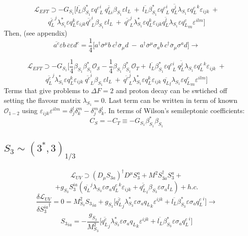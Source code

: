 \documentclass{article}
\begin{document}
\[
\mathcal{L}_{EFT} \supset -G_{S_1} \big[  \overline{l_L} \beta^*_{S_1} \varepsilon {q^c}^i_{L} \ \overline{q^c_{L i}} \beta_{S_1} \varepsilon l_L \ + \  \overline{l_L} \beta^*_{S_1} \varepsilon {q^c}^i_{L} \ \overline{q^j_L} \lambda_{S_1} \varepsilon {q^{c}_L}^k \varepsilon_{ijk} \ + 
\]
\[
\overline{q^c_L}^j \lambda_{S_1}^* \varepsilon q^k_L \varepsilon_{ijk}  \overline{q^c}^i_{L} \beta_{S_1} \varepsilon l_L \ + \ \overline{q^c}_L^j \lambda_{S_1}^* \varepsilon q^k_L \varepsilon_{ijk}  \overline{q^l_L} \lambda_{S_1} \varepsilon {q^c_L}_m \varepsilon^{ilm} \big]
\]
Then, (see appendix)
\[
\overline{a^c} \varepsilon b \  \overline{c} \varepsilon d^c =\frac{1}{4}\big[ a^\dagger \overline{\sigma}^ \mu b \ c^\dagger \overline{\sigma}_\mu d \ - \ a^\dagger \overline{\sigma}^\mu  \sigma_a b \ c^\dagger \overline{\sigma}_\mu  \sigma^a d \big] \rightarrow
\]

\[
\mathcal{L}_{EFT} \supset -G_{S_1} \big[ \frac{1}{4} \beta_{S_1} \beta_{S_1}^* \mathcal{O_S} - \frac{1}{4} \beta_{S_1} \beta_{S_1}^* \mathcal{O}_T + \  \overline{l_L} \beta^*_{S_1} \varepsilon {q^c}^i_{L} \ \overline{q^j_L} \lambda_{S_1} \varepsilon {q^{c}_L}^k \varepsilon_{ijk} \ + 
\]
\[
\overline{q^c_L}^j \lambda_{S_1}^* \varepsilon q^k_L \varepsilon_{ijk} \  \overline{q^c}^i_{L} \beta_{S_1} \varepsilon l_L \ + \ \overline{q^c}_L^j \lambda_{S_1}^* \varepsilon q^k_L \varepsilon_{ijk} \ \overline{q_L}_l \lambda_{S_1} \varepsilon {q^c_L}_m \varepsilon^{ilm} \big]
\]
Terms that give problems to $\Delta F=2$ and proton decay can be swtiched off setting the flavour matrix $\lambda_{S_1}=0$. Last term can be written in term of known $\mathcal{O}_{1-2}$ using $\varepsilon_{ijk} \varepsilon^{ilm} = \delta_j^l \delta_k^m -\delta_j^m \delta_k^l $.
In terms of Wilson's semileptonic coefficients:
\[
C_S = - C_T \equiv - G_{S_1} \beta^*_{S_1} \beta_{S_1} 
\]
\subsection{$S_3 \sim (3^*, 3)_{1/3}$}
\[
\mathcal{L}_{UV} \supset (D_\mu S_{3a})^\dagger D^\mu S_3^a + M^2 S_{3a}^\dagger S_3^a +
\]
\[
+g_{S_3} S_3^{ia}(\overline{q_L}^j \lambda_{S_3} \varepsilon \sigma_a {q^c_L}^k \varepsilon_{ijk} + \overline{q_L^c}_i \beta_{S_3} \varepsilon \sigma_a l_L) +h.c.
\]
\[
\frac{\delta \mathcal{L}_{UV}}{\delta {S_{3}^{ia}}^\dagger} =0 = M^2_{S_3} {S_3}_{ia} + g_{S_3} \big[ \overline{q_L^c}_j \lambda^*_{S_3} \varepsilon \sigma_a {q_L}_k \varepsilon^{ijk} + \overline{l_L} \beta_{S_3}^* \varepsilon \sigma_a {q^c_L}^i \big] \rightarrow
\]
\[
{S_3}_{ia} = -\frac{g_{S_3}}{M^2_{S_3}} \big[ \overline{q_L^c}_j \lambda^*_{S_3} \varepsilon \sigma_a {q_L}_k \varepsilon^{ijk} + \overline{l_L} \beta_{S_3}^* \varepsilon \sigma_a {q^c_L}^i \big] 
\]
\end{document}
